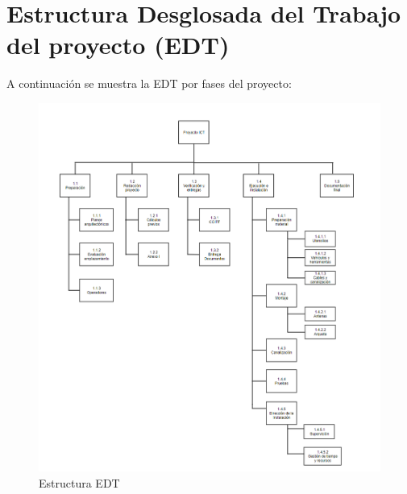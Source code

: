 \section{Estructura Desglosada del Trabajo del proyecto (EDT)}
A continuación se muestra la EDT por fases del proyecto:
\begin{figure}[H]
\centering
\includegraphics[scale = 0.55]{project/images/edt.png}
\caption{Estructura EDT}
\end{figure}
